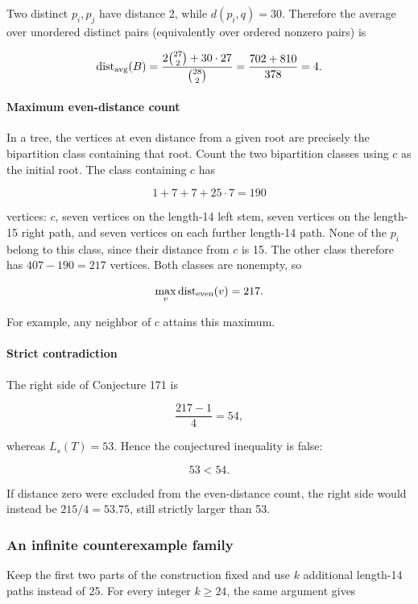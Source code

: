 \documentclass[11pt,a4paper]{article}
\theoremstyle{definition}\newtheorem{definition}[theorem]{Definition}
\theoremstyle{remark}\newtheorem{remark}[theorem]{Remark}
\begin{document}
Two distinct \(p_i,p_j\) have distance 2, while \(d(p_i,q)=30\).
Therefore the average over unordered distinct pairs (equivalently over
ordered nonzero pairs) is

\[\operatorname{dist}_{\rm avg}(B)
=\frac{2\binom{27}{2}+30\cdot27}{\binom{28}{2}}
=\frac{702+810}{378}=4.\]

\paragraph{Maximum even-distance
count}\label{late:171:maximum-even-distance-count}

In a tree, the vertices at even distance from a given root are precisely
the bipartition class containing that root. Count the two bipartition
classes using \(c\) as the initial root. The class containing \(c\) has

\[1+7+7+25\cdot7=190\]

vertices: \(c\), seven vertices on the length-14 left stem, seven
vertices on the length-15 right path, and seven vertices on each further
length-14 path. None of the \(p_i\) belong to this class, since their
distance from \(c\) is 15. The other class therefore has \(407-190=217\)
vertices. Both classes are nonempty, so

\[\max_v\operatorname{dist}_{\rm even}(v)=217.\]

For example, any neighbor of \(c\) attains this maximum.

\paragraph{Strict contradiction}\label{late:171:strict-contradiction}

The right side of Conjecture 171 is

\[\frac{217-1}{4}=54,\]

whereas \(L_s(T)=53\). Hence the conjectured inequality is false:

\[\boxed{53<54.}\]

If distance zero were excluded from the even-distance count, the right
side would instead be \(215/4=53.75\), still strictly larger than 53.

\subsubsection{An infinite counterexample
family}\label{late:171:an-infinite-counterexample-family}

Keep the first two parts of the construction fixed and use \(k\)
additional length-14 paths instead of 25. For every integer \(k\geq24\),
the same argument gives
\end{document}
